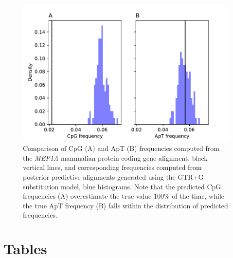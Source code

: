 \documentclass{article}
\begin{document}
\begin{figure}[H]
  \centering
  \includegraphics[width=\textwidth,height=\textheight,keepaspectratio]{figures/figure1.pdf}
  \caption{Comparison of CpG (A) and ApT (B) frequencies computed from the \emph{MEP1A} mammalian protein-coding gene alignment, black vertical lines, and corresponding frequencies computed from posterior predictive alignments generated using the GTR+G substitution model, blue histograms. Note that the predicted CpG frequencies (A) overestimate the true value 100\% of the time, while the true ApT frequency (B) falls within the distribution of predicted frequencies.}
  \label{figure1}
\end{figure}

\newpage
\section*{Tables}
\end{document}
